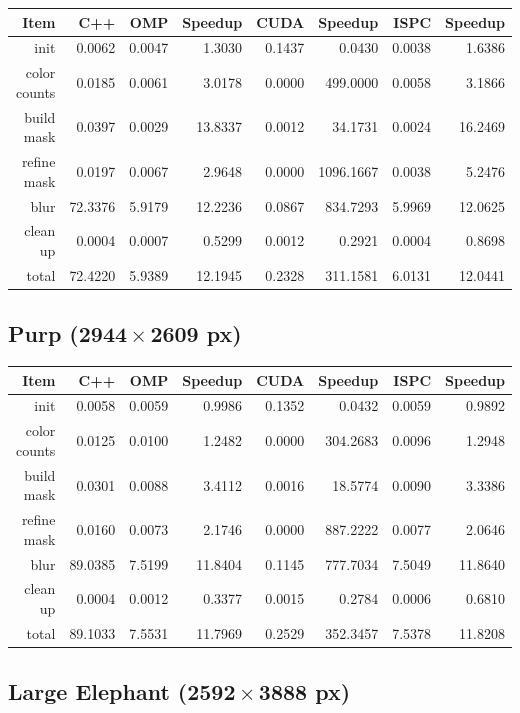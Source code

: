 \documentclass[12pt]{article}
\begin{document}
\begin{tabular}{r|r|r|r|r|r|r|r}
    Item & C++ & OMP & Speedup & CUDA & Speedup & ISPC & Speedup
\\  \hline
    init & 0.0062 & 0.0047 & 1.3030 & 0.1437 & 0.0430 & 0.0038 & 1.6386
\\  color counts & 0.0185 & 0.0061 & 3.0178 & 0.0000 & 499.0000 & 0.0058 & 3.1866
\\  build mask & 0.0397 & 0.0029 & 13.8337 & 0.0012 & 34.1731 & 0.0024 & 16.2469
\\  refine mask & 0.0197 & 0.0067 & 2.9648 & 0.0000 & 1096.1667 & 0.0038 & 5.2476
\\  blur & 72.3376 & 5.9179 & 12.2236 & 0.0867 & 834.7293 & 5.9969 & 12.0625
\\  clean up & 0.0004 & 0.0007 & 0.5299 & 0.0012 & 0.2921 & 0.0004 & 0.8698
\\  \hline
    total & 72.4220 & 5.9389 & 12.1945 & 0.2328 & 311.1581 & 6.0131 & 12.0441
\end{tabular}

\subsection{Purp ($\mathbf{2944 \times 2609}$ px)}

\begin{tabular}{r|r|r|r|r|r|r|r}
    Item & C++ & OMP & Speedup & CUDA & Speedup & ISPC & Speedup
\\  \hline
    init & 0.0058 & 0.0059 & 0.9986 & 0.1352 & 0.0432 & 0.0059 & 0.9892
\\  color counts & 0.0125 & 0.0100 & 1.2482 & 0.0000 & 304.2683 & 0.0096 & 1.2948
\\  build mask & 0.0301 & 0.0088 & 3.4112 & 0.0016 & 18.5774 & 0.0090 & 3.3386
\\  refine mask & 0.0160 & 0.0073 & 2.1746 & 0.0000 & 887.2222 & 0.0077 & 2.0646
\\  blur & 89.0385 & 7.5199 & 11.8404 & 0.1145 & 777.7034 & 7.5049 & 11.8640
\\  clean up & 0.0004 & 0.0012 & 0.3377 & 0.0015 & 0.2784 & 0.0006 & 0.6810
\\  \hline
    total & 89.1033 & 7.5531 & 11.7969 & 0.2529 & 352.3457 & 7.5378 & 11.8208
\end{tabular}

\subsection{Large Elephant ($\mathbf{2592 \times 3888}$ px)}
\end{document}
